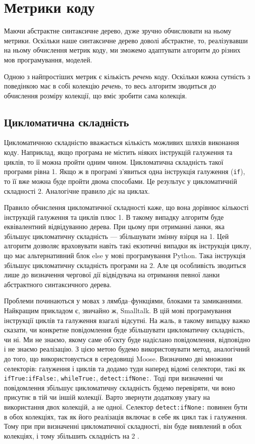 \documentclass[12pt,a4paper]{article}
\begin{document}
\section{Метрики коду}
Маючи абстрактне синтаксичне дерево, дуже зручно обчислювати на ньому метрики. Оскільки наше синтаксичне дерево доволі абстрактне, то, реалізувавши на ньому обчислення метрик коду, ми зможемо адаптувати алгоритм до різних мов програмування, моделей. 

Одною з найпростіших метрик є кількість \emph{речень} коду. Оскільки кожна сутність з поведінкою має в собі колекцію \emph{речень}, то весь алгоритм зводиться до обчислення розміру колекції, що вміє зробити сама колекція.

\subsection{Цикломатична складність}
Цикломатичною складністю вважається кількість можливих шляхів виконання коду. Наприклад, якщо програма не містить ніяких інструкцій галуження та циклів, то її можна пройти одним чином. Цикломатична складність такої програми рівна 1. Якщо ж в програмі з'явиться одна інструкція галуження (\lstinline$if$), то її вже можна буде пройти двома способами. Це результує у цикломатичній складності 2. Аналогічне правило діє на циклах. 

Правило обчислення цикломатичної складності каже, що вона дорівнює кількості інструкцій галуження та циклів плюс 1. В такому випадку алгоритм буде еквівалентний відвідуванню дерева. При цьому при отриманні ланки, яка збільшує цикломатичну складність --- збільшувати змінну взірця на 1. Цей алгоритм дозволяє враховувати навіть такі екзотичні випадки як інструкція циклу, що має альтернативний блок else у мові програмування Python. Така інструкція збільшує цикломатичну складність програми на 2. Але ця особливість зводиться лише до визначення чергової дії відвідувача на отримання певної ланки абстрактного синтаксичного дерева.

Проблеми починаються у мовах з лямбда--функціями, блоками та замиканнями. Найкращим прикладом є, звичайно ж, Smalltalk. В цій мові програмування інструкції циклів та галуження взагалі відсутні. На жаль, в такому випадку важко сказати, чи конкретне повідомлення буде збільшувати цикломатичну складність, чи ні. Ми не знаємо, якому саме об'єкту буде надіслано повідомлення, відповідно і не знаємо реалізацію. З цією метою будемо використовувати метод, аналогічний до того, що використовується в середовищі Moose. Визначимо дві множини селекторів: галуження і циклів та додамо туди наперед відомі селектори, такі як \lstinline$ifTrue:ifFalse:$, \lstinline$whileTrue:$, \lstinline$detect:ifNone:$. Тоді при визначенні чи повідомлення збільшує цикломатичну складність будемо перевіряти, чи воно присутнє в тій чи іншій колекції. Варто звернути додаткову увагу на використання двох колекцій, а не одної. Селектор \lstinline$detect:ifNone:$ повинен бути в обох колекціях, так як його реалізація включає в себе як цикл так і галуження. Тому при при визначенні цикломатичної складності, він буде виявлений в обох колекціях, і тому збільшить складність на 2 \cite{cyclocomplexity-moose}.
\end{document}
